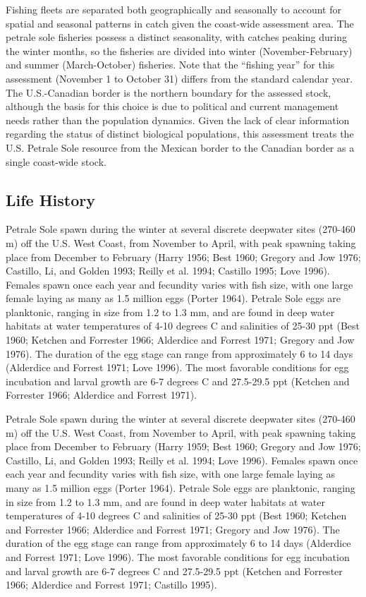 \documentclass[11pt,
  english,
  letterpaper,
]{article}
\begin{document}
Fishing fleets are separated both geographically and seasonally to account for spatial and seasonal patterns in catch given the coast-wide assessment area. The petrale sole fisheries possess a distinct seasonality, with catches peaking during the winter months, so the fisheries are divided into winter (November-February) and summer (March-October) fisheries. Note that the ``fishing year'' for this assessment (November 1 to October 31) differs from the standard calendar year. The U.S.-Canadian border is the northern boundary for the assessed stock, although the basis for this choice is due to political and current management needs rather than the population dynamics. Given the lack of clear information regarding the status of distinct biological populations, this assessment treats the U.S. Petrale Sole resource from the Mexican border to the Canadian border as a single coast-wide stock.

\hypertarget{life-history}{%
\subsection{Life History}\label{life-history}}

Petrale Sole spawn during the winter at several discrete deepwater sites (270-460 m) off the U.S. West Coast, from November to April, with peak spawning taking place from December to February (Harry 1956; Best 1960; Gregory and Jow 1976; Castillo, Li, and Golden 1993; Reilly et al. 1994; Castillo 1995; Love 1996). Females spawn once each year and fecundity varies with fish size, with one large female laying as many as 1.5 million eggs (Porter 1964). Petrale Sole eggs are planktonic, ranging in size from 1.2 to 1.3 mm, and are found in deep water habitats at water temperatures of 4-10 degrees C and salinities of 25-30 ppt (Best 1960; Ketchen and Forrester 1966; Alderdice and Forrest 1971; Gregory and Jow 1976). The duration of the egg stage can range from approximately 6 to 14 days (Alderdice and Forrest 1971; Love 1996). The most favorable conditions for egg incubation and larval growth are 6-7 degrees C and 27.5-29.5 ppt (Ketchen and Forrester 1966; Alderdice and Forrest 1971).

Petrale Sole spawn during the winter at several discrete deepwater sites (270-460 m) off the U.S. West Coast, from November to April, with peak spawning taking place from December to February (Harry 1959; Best 1960; Gregory and Jow 1976; Castillo, Li, and Golden 1993; Reilly et al. 1994; Love 1996). Females spawn once each year and fecundity varies with fish size, with one large female laying as many as 1.5 million eggs (Porter 1964). Petrale Sole eggs are planktonic, ranging in size from 1.2 to 1.3 mm, and are found in deep water habitats at water temperatures of 4-10 degrees C and salinities of 25-30 ppt (Best 1960; Ketchen and Forrester 1966; Alderdice and Forrest 1971; Gregory and Jow 1976). The duration of the egg stage can range from approximately 6 to 14 days (Alderdice and Forrest 1971; Love 1996). The most favorable conditions for egg incubation and larval growth are 6-7 degrees C and 27.5-29.5 ppt (Ketchen and Forrester 1966; Alderdice and Forrest 1971; Castillo 1995).
\end{document}
